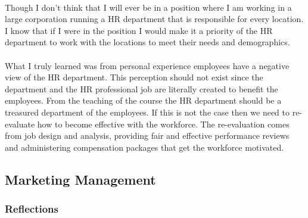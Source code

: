 \documentclass[12pt,titlepage]{article}
\begin{document}
\paragraph {}
Though I don't think that I will ever be in a position where I am working in a large corporation running a HR department that is responsible for every location. I know that if I were in the position I would make it a priority of the HR department to work with the locations to meet their needs and demographics.
\paragraph {}
What I truly learned was from personal experience employees have a negative view of the HR department. This perception should not exist since the department and the HR professional job are literally created to benefit the employees. From the teaching of the course the HR department should be a treasured department of the employees. If this is not the case then we need to re-evaluate how to become effective with the workforce. The re-evaluation comes from job design and analysis, providing fair and effective performance reviews and administering compensation packages that get the workforce motivated.


\restoregeometry


\restoregeometry


\subsection{Marketing Management}
\subsubsection{Reflections}
\end{document}
